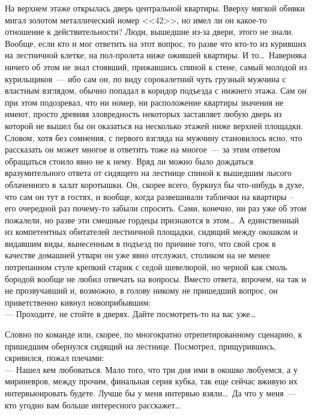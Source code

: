 
На верхнем этаже открылась дверь центральной квартиры. Вверху мягкой обивки 
мигал золотом металлический номер <<42>>, но имел ли он какое-то отношение к 
действительности? Люди, вышедшие из-за двери, этого не знали. Вообще, если кто 
и мог ответить на этот вопрос, то разве что кто-то из куривших на лестничной 
клетке, на пол-пролета ниже ожившей квартиры. И то\ldots\ Наверняка ничего об 
этом не знал стоявший, прижавшись спиной к стене, самый молодой из курильщиков~--- ибо 
сам он, по виду сорокалетний чуть грузный мужчина с властным взглядом, обычно 
попадал в коридор подъезда с нижнего этажа. Сам он при этом подозревал, что ни 
номер, ни расположение квартиры значения не имеют, просто древняя зловредность 
некоторых заставляет любую дверь из которой не вышел бы он оказаться на 
несколько этажей ниже верхней площадки. Словом, хотя без сомнения, с первого 
взгляда на мужчину становилось ясно, что рассказать он может многое и ответить 
тоже на многое~--- за этим ответом обращаться стоило явно не к нему. Вряд ли 
можно было дождаться вразумительного ответа от сидящего на лестнице спиной к вышедшим 
лысого облаченного в халат коротышки. Он, скорее всего, буркнул бы что-нибудь в 
духе, что сам он тут в гостях, и вообще, когда развешивали таблички на квартиры 
– его очередной раз почему-то забыли спросить. Сами, конечно, ни раз уже об 
этом пожалели, но разве эти смешные гордецы признаются в этом\ldots\ А единственный 
из компетентных обитателей лестничной площадки, сидящий между окошком и видавшим 
виды, вынесенным в подъезд по причине того, что свой срок в качестве домашней 
утвари он уже явно отслужил, столиком на не менее потрепанном стуле крепкий 
старик с седой шевелюрой, но черной как смоль бородой вообще не любил отвечать 
на вопросы. Вместо ответа, впрочем, на так и не прозвучавший и, возможно, в 
голову никому не пришедший вопрос, он приветственно кивнул новоприбывшим:\\
--- Проходите, не стойте в дверях. Дайте посмотреть-то на вас уже\ldots

Словно по команде или, скорее, по многократно отрепетированному сценарию, к 
пришедшим обернулся сидящий на лестнице. Посмотрел, прищурившись, скривился, 
пожал плечами:\\
--- Нашел кем любоваться. Мало того, что три дня ими в окошко любуемся, а у 
мириневров, между прочим, финальная серия кубка, так еще сейчас вживую их 
интервьюировать будете. Лучше бы у меня интервью взяли\ldots\ Да что у меня~--- 
кто угодно вам больше интересного расскажет\ldots

